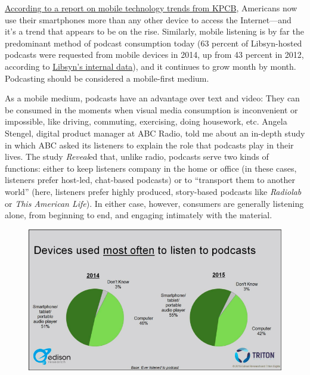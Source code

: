 \documentclass[notoc, symmetric, nobib, nols]{towcenter-guideto-book}
\begin{document}
\href{http://www.smartinsights.com/internet-marketing-statistics/insights-from-kpcb-us-and-global-internet-trends-2015-report/}{According to a report on mobile technology trends from KPCB}, Americans now use their smartphones more than any other device to access the Internet---and it's a trend that appears to be on the rise.\autocite{KPCB} Similarly, mobile listening is by far the predominant method of podcast consumption today (63 percent of Libsyn-hosted podcasts were requested from mobile devices in 2014, up from 43 percent in 2012, according to \href{http://www.libsyn.com/wp-content/uploads/2015/06/PRLibsynNetGrowth021915Final.pdf}{Libsyn's internal data}), and it continues to grow month by month.\autocite{libsyndata} Podcasting should be considered a mobile-first medium.


As a mobile medium, podcasts have an advantage over text and video: They can be consumed in the moments when visual media consumption is inconvenient or impossible, like driving, commuting, exercising, doing housework, etc. Angela Stengel, digital product manager at ABC Radio, told me about an in-depth study in which ABC asked its listeners to explain the role that podcasts play in their lives. The study \textit{Reveal}ed that, unlike radio, podcasts serve two kinds of functions: either to keep listeners company in the home or office (in these cases, listeners prefer host-led, chat-based podcasts) or to ``transport them to another world'' (here, listeners prefer highly produced, story-based podcasts like \textit{Radiolab} or \textit{This American Life}). In either case, however, consumers are generally listening alone, from beginning to end, and engaging intimately with the material.\autocite{Stengel} 

\begin{figure}
\begin{centering}
\includegraphics[width=.9\textwidth]{graphics/PODCAST15_EdInfinite_devices.png}
\caption{}
\end{centering}
\end{figure}
\end{document}
